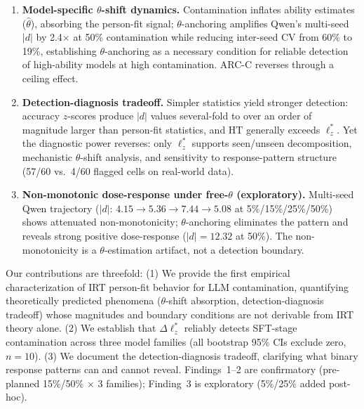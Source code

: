 \begin{enumerate}[leftmargin=*,nosep]
\item \textbf{Model-specific $\theta$-shift dynamics.} Contamination inflates ability estimates ($\hat{\theta}$), absorbing the person-fit signal; $\theta$-anchoring amplifies Qwen's multi-seed $|d|$ by 2.4$\times$ at 50\% contamination while reducing inter-seed CV from 60\% to 19\%, establishing $\theta$-anchoring as a necessary condition for reliable detection of high-ability models at high contamination. ARC-C reverses through a ceiling effect.

\item \textbf{Detection-diagnosis tradeoff.} Simpler statistics yield stronger detection: accuracy $z$-scores produce $|d|$ values several-fold to over an order of magnitude larger than person-fit statistics, and HT generally exceeds $\ell_z^*$. Yet the diagnostic power reverses: only $\ell_z^*$ supports seen/unseen decomposition, mechanistic $\theta$-shift analysis, and sensitivity to response-pattern structure (57/60 vs.\ 4/60 flagged cells on real-world data).

\item \textbf{Non-monotonic dose-response under free-$\theta$ (exploratory).} Multi-seed Qwen trajectory ($|d|$: $4.15 \to 5.36 \to 7.44 \to 5.08$ at 5\%/15\%/25\%/50\%) shows attenuated non-monotonicity; $\theta$-anchoring eliminates the pattern and reveals strong positive dose-response ($|d|{=}12.32$ at 50\%). The non-monotonicity is a $\theta$-estimation artifact, not a detection boundary.
\end{enumerate}

Our contributions are threefold:
(1) We provide the first empirical characterization of IRT person-fit behavior for LLM contamination, quantifying theoretically predicted phenomena ($\theta$-shift absorption, detection-diagnosis tradeoff) whose magnitudes and boundary conditions are not derivable from IRT theory alone.
(2) We establish that $\Delta\ell_z^*$ reliably detects SFT-stage contamination across three model families (all bootstrap 95\% CIs exclude zero, $n{=}10$).
(3) We document the detection-diagnosis tradeoff, clarifying what binary response patterns can and cannot reveal.
Findings~1--2 are confirmatory (pre-planned 15\%/50\% $\times$ 3 families); Finding~3 is exploratory (5\%/25\% added post-hoc).
